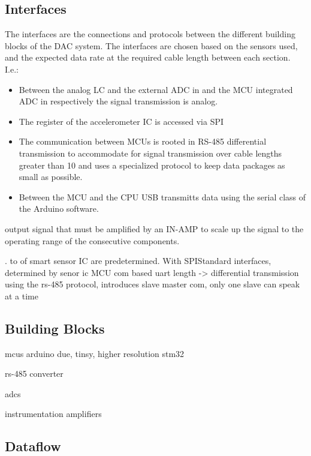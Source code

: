 \subsection{Interfaces}

The interfaces are the connections and protocols between the different building blocks of the \ac{DAC} system. The interfaces are chosen based on the sensors used, and the expected data rate at the required cable length between each section. I.e.:

\begin{itemize}
    \item Between the analog \ac{LC} and the external \ac{ADC} in  and the \ac{MCU} integrated \ac{ADC}  in  respectively the signal transmission is analog.
    \item The register of the accelerometer \ac{IC} is accessed via \ac{SPI}
    \item The communication between \acs{MCU}s is rooted in \acs{RS}-485 differential transmission to accommodate for signal transmission over cable lengths greater than \SI{10}{\meters} and uses a specialized protocol to keep data packages as small as possible.
    \item Between the \ac{MCU} and the \ac{CPU} \ac{USB} transmitts data using the serial class of the Arduino software.
\end{itemize}


    output signal that must be amplified by an \ac{IN-AMP} to scale up the signal to the operating range of the consecutive components.

. to of smart sensor IC are predetermined. With \ac{SPI}Standard interfaces, determined by senor ic
MCU com based uart length -> differential transmission using the rs-485 protocol, introduces slave master com, only one slave can speak at a time

\subsection{Building Blocks}
mcus
arduino due,
tinsy, higher resolution
stm32

rs-485 converter

adcs

instrumentation amplifiers

\subsection{Dataflow}


